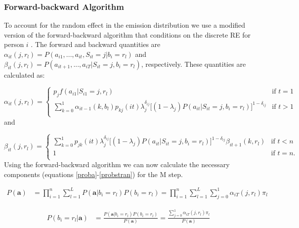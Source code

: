 \documentclass{article}
\begin{document}
\subsubsection{Forward-backward Algorithm}
To account for the random effect in the emission distribution we use a modified version of the forward-backward algorithm that conditions on the discrete RE for person $i$ \cite{Maruotti2011}. The forward and backward quantities are $\alpha_{it}(j,r_l) = P(a_{i1}, ..., a_{it}, S_{it} = j | b_i=r_l)$ and $\beta_{it}(j,r_l) =  P(a_{it+1}, ..., a_{iT} | S_{it} = j,b_i=r_l)$, respectively. These quantities are calculated as: 
 
\begin{equation} \label{fwd}
    \alpha_{it}(j,r_l) = \begin{cases}
        p_{j} f(a_{i1}|S_{i1}=j,r_l) & \text{if } t = 1 \\
        \sum_{k=0}^1 \alpha_{it-1} (k,b_l)p_{kj}(it)\lambda_j^{\delta_{ij}} \big[(1-\lambda_j)P(a_{it}|S_{it}=j,b_i=r_l)\big]^{1-\delta_{ij}}
            & \text{if } t > 1\\
    \end{cases}
\end{equation}
and
    
\begin{equation} \label{bkwd}
\beta_{it}(j,r_l) = \begin{cases} 
    \sum_{k=0}^1p_{jk}(it)\lambda_j^{\delta_{ij}} \big[(1-\lambda_j)P(a_{it}|S_{it}=j,b_i=r_l)\big]^{1-\delta_{ij}}\beta_{it+1}(k,r_l) 
        & \text{if } t < n \\
    1 & \text{if } t = n. \\
\end{cases}
\end{equation}
Using the forward-backward algorithm we can now calculate the necessary components (equations \ref{proba}-\ref{probstran}) for the M step. 


\begin{equation}\label{proba}
\begin{split}
    P(\textbf{a}) & = \prod_{i=1}^n \sum_{l=1}^L 
        P(\textbf{a}|b_{i}=r_l)P(b_{i}=r_l) = 
    \prod_{i=1}^n \sum_{l=1}^L \sum_{j=0}^1 \alpha_{iT}(j,r_l)\pi_l 
\end{split}
\end{equation}

\begin{equation}\label{probl}
\begin{split}
    P(b_{i}=r_l|\textbf{a}) & = \frac{P(\textbf{a}|b_{i}=r_l)P(b_{i}=r_l)}{P(\textbf{a})} = 
    \frac{\sum_{j=0}^1 \alpha_{iT}(j,r_l)\pi_l }{P(\textbf{a})}  
\end{split}
\end{equation}
\end{document}
